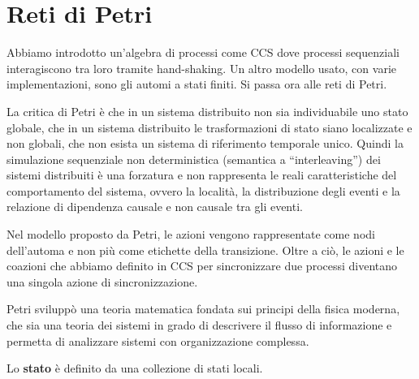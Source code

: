 \chapter{Reti di Petri}
Abbiamo introdotto un'algebra di processi come CCS dove processi sequenziali
interagiscono tra loro tramite hand-shaking. Un altro modello usato, con varie
implementazioni, sono gli automi a stati finiti. Si passa ora alle reti di Petri.

La critica di Petri è che in un sistema distribuito non sia individuabile uno
stato globale, che in un sistema distribuito le trasformazioni di stato siano
localizzate e non globali, che non esista un sistema di riferimento temporale
unico. Quindi la simulazione sequenziale non deterministica (semantica a
“interleaving”) dei sistemi distribuiti è una forzatura e non rappresenta le
reali caratteristiche del comportamento del sistema, ovvero la località, la
distribuzione degli eventi e la relazione di dipendenza causale e non causale
tra gli eventi.

Nel modello proposto da Petri, le azioni vengono rappresentate come nodi
dell'automa e non più come etichette della transizione. Oltre a ciò, le azioni e
le coazioni che abbiamo definito in CCS per sincronizzare due processi diventano
una singola azione di sincronizzazione.

Petri sviluppò una teoria matematica fondata sui principi della fisica moderna,
che sia una teoria dei sistemi in grado di descrivere il flusso di informazione
e permetta di analizzare sistemi con organizzazione complessa.

Lo \textbf{stato} è definito da una collezione di stati locali.
